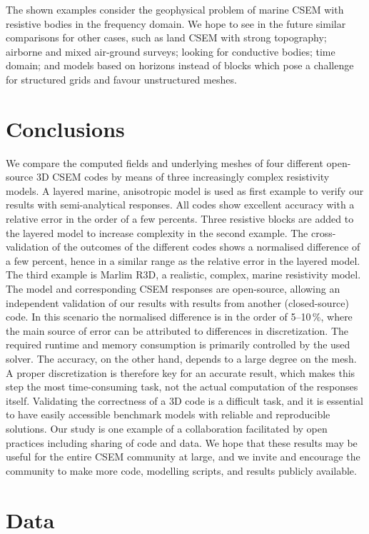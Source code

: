 \documentclass[onecolumn,extra,camera]{gji}
\begin{document}
The shown examples consider the geophysical problem of marine CSEM with resistive bodies in the frequency domain. We hope to see in the future similar comparisons for other cases, such as land CSEM with strong topography; airborne and mixed air-ground surveys; looking for conductive bodies; time domain; and models based on horizons instead of blocks which pose a challenge for structured grids and favour unstructured meshes.

\section{Conclusions}

We compare the computed fields and underlying meshes of four different open-source 3D CSEM codes by means of three increasingly complex resistivity models. A layered marine, anisotropic model is used as first example to verify our results with semi-analytical responses. All codes show excellent accuracy with a relative error in the order of a few percents. Three resistive blocks are added to the layered model to increase complexity in the second example. The cross-validation of the outcomes of the different codes shows a normalised difference of a few percent, hence in a similar range as the relative error in the layered model. The third example is Marlim R3D, a realistic, complex, marine resistivity model. The model and corresponding CSEM responses are open-source, allowing an independent validation of our results with results from another (closed-source) code. In this scenario the normalised difference is in the order of 5--10\,\%, where the main source of error can be attributed to differences in discretization. The required runtime and memory consumption is primarily controlled by the used solver. The accuracy, on the other hand, depends to a large degree on the mesh. A proper discretization is therefore key for an accurate result, which makes this step the most time-consuming task, not the actual computation of the responses itself. Validating the correctness of a 3D code is a difficult task, and it is essential to have easily accessible benchmark models with reliable and reproducible solutions. Our study is one example of a collaboration facilitated by open practices including sharing of code and data. We hope that these results may be useful for the entire CSEM community at large, and we invite and encourage the community to make more code, modelling scripts, and results publicly available.


\section{Data}
\end{document}
